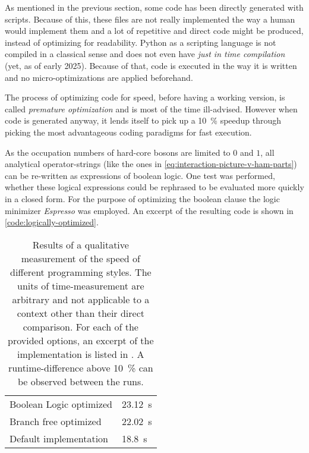 As mentioned in the previous section, some code has been directly generated with scripts.
Because of this, these files are not really implemented the way a human would implement them and a lot of repetitive and direct code might be produced, instead of optimizing for readability.
Python as a scripting language is not compiled in a classical sense and does not even have \emph{just in time compilation} (yet, as of early 2025).
Because of that, code is executed in the way it is written and no micro-optimizations are applied beforehand.

The process of optimizing code for speed, before having a working version, is called \emph{premature optimization} and is most of the time ill-advised.
However when code is generated anyway, it lends itself to pick up a \SI{10}{\percent} speedup through picking the most advantageous coding paradigms for fast execution.

As the occupation numbers of hard-core bosons are limited to $0$ and $1$, all analytical operator-strings (like the ones in \autoref{eq:interaction-picture-v-ham-parts}) can be re-written as expressions of boolean logic.
One test was performed, whether these logical expressions could be rephrased to be evaluated more quickly in a closed form. 
For the purpose of optimizing the boolean clause the logic minimizer \emph{Espresso} \cite{espresso} was employed.
An excerpt of the resulting code is shown in \ref{code:logically-optimized}.

\begin{table}[htbp]
    \centering
    \begin{tabular}{l|l} 
        \toprule
             Boolean Logic optimized & \SI{23.12}{\second}\\
             Branch free optimized & \SI{22.02}{\second}\\
             Default implementation & \SI{18.8}{\second}\\
        \bottomrule
    \end{tabular}
    \vspace{0.5cm}
    \caption{
        Results of a qualitative measurement of the speed of different programming styles.
        The units of time-measurement are arbitrary and not applicable to a context other than their direct comparison.
        For each of the provided options, an excerpt of the implementation is listed in .
        A runtime-difference above \SI{10}{\percent} can be observed between the runs.
    }
    \label{table:style-optimizations-runtime}
\end{table}

